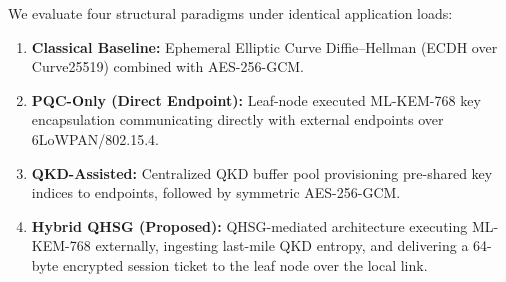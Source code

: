\documentclass[journal]{IEEEtran}
\begin{document}
We evaluate four structural paradigms under identical application loads:
\begin{enumerate}
    \item \textbf{Classical Baseline:} Ephemeral Elliptic Curve Diffie--Hellman (ECDH over
    Curve25519) combined with AES-256-GCM.
    \item \textbf{PQC-Only (Direct Endpoint):} Leaf-node executed ML-KEM-768 key encapsulation
    communicating directly with external endpoints over 6LoWPAN/802.15.4.
    \item \textbf{QKD-Assisted:} Centralized QKD buffer pool provisioning pre-shared key
    indices to endpoints, followed by symmetric AES-256-GCM.
    \item \textbf{Hybrid QHSG (Proposed):} QHSG-mediated architecture executing ML-KEM-768
    externally, ingesting last-mile QKD entropy, and delivering a 64-byte encrypted session
    ticket to the leaf node over the local link.
\end{enumerate}

\begin{table}[htbp]
\centering
\caption{Cryptographic Parameters and Leaf-Node Resource Baselines}
\label{tab:crypto_params}
\small
{}
\end{table}
\end{document}

